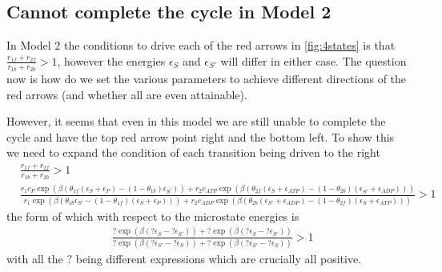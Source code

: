 \documentclass[11pt]{article}
\begin{document}
\subsection{Cannot complete the cycle in Model 2}\label{sec:noFC}
In Model 2 the conditions to drive each of the red arrows in \cref{fig:4states} is that $\frac{r_{1f}+r_{2f}}{r_{1b}+r_{2b}} > 1$, however the energies $\epsilon_S$ and $\epsilon_{S'}$ will differ in either case.
The question now is how do we set the various parameters to achieve different directions of the red arrows (and whether all are even attainable).

However, it seems that even in this model we are still unable to complete the cycle and have the top red arrow point right and the bottom left.
To show this we need to expand the condition of each transition being driven to the right
\begin{align}
    &\frac{r_{1f}+r_{2f}}{r_{1b}+r_{2b}} > 1 \\
    &\frac{r_1c_P\exp(\beta(\theta_{1f}(\epsilon_S+\epsilon_P)-(1-\theta_{1b})\epsilon_{S'})) + r_2c_{ATP}\exp(\beta(\theta_{2f}(\epsilon_S+\epsilon_{ATP})-(1-\theta_{2b})(\epsilon_{S'}+\epsilon_{ADP})))}{r_1\exp(\beta(\theta_{1b}\epsilon_{S'}-(1-\theta_{1f})(\epsilon_S+\epsilon_P))) + r_2c_{ADP}\exp(\beta(\theta_{2b}(\epsilon_{S'}+\epsilon_{ADP})-(1-\theta_{2f})(\epsilon_S+\epsilon_{ATP})))} > 1
\end{align}
the form of which with respect to the microstate energies is
\begin{align}
    &\frac{?\exp(\beta(?\epsilon_S-?\epsilon_{S'})) + ?\exp(\beta(?\epsilon_S-?\epsilon_{S'}))}{?\exp(\beta(?\epsilon_{S'}-?\epsilon_S)) + ?\exp(\beta(?\epsilon_{S'}-?\epsilon_S))} > 1
\end{align}
with all the $?$ being different expressions which are crucially all positive.
\end{document}
